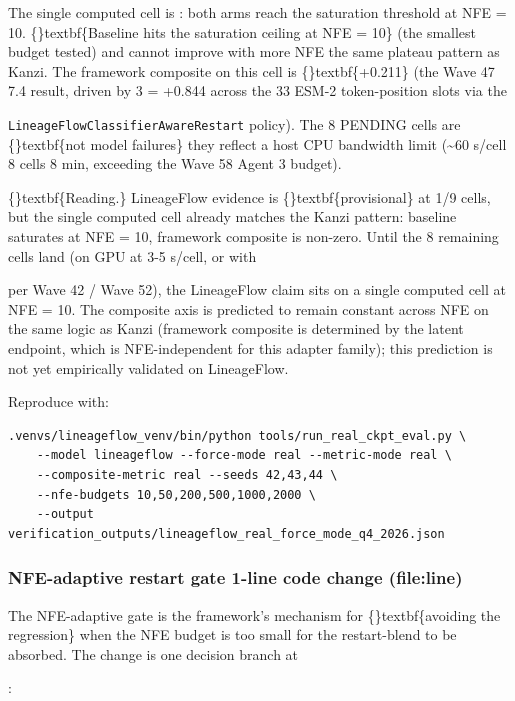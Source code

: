 \documentclass{article}
\begin{document}
The single computed cell is : both arms reach the  saturation threshold at NFE = 10. \{\}textbf\{Baseline hits the saturation ceiling at NFE = 10\} (the smallest budget tested) and cannot improve with more NFE  the same plateau pattern as Kanzi. The framework composite on this cell is \{\}textbf\{+0.211\} (the Wave 47 7.4 result, driven by 3 = +0.844 across the 33 ESM-2 token-position slots via the

\texttt{LineageFlowClassifierAwareRestart} policy). The 8 PENDING cells are \{\}textbf\{not model failures\}  they reflect a host CPU bandwidth limit (\textasciitilde{}60 s/cell  8 cells  8 min, exceeding the Wave 58 Agent 3 budget).

\{\}textbf\{Reading.\} LineageFlow evidence is \{\}textbf\{provisional\} at 1/9 cells, but the single computed cell already matches the Kanzi pattern: baseline saturates at NFE = 10, framework composite is non-zero. Until the 8 remaining cells land (on GPU at  3-5 s/cell, or with

 per Wave 42 / Wave 52), the LineageFlow claim sits on a single computed cell at NFE = 10. The composite axis is predicted to remain constant across NFE on the same logic as Kanzi (framework composite is determined by the latent endpoint, which is NFE-independent for this adapter family); this prediction is not yet empirically validated on LineageFlow.

Reproduce with:

\begin{verbatim}
.venvs/lineageflow_venv/bin/python tools/run_real_ckpt_eval.py \
    --model lineageflow --force-mode real --metric-mode real \
    --composite-metric real --seeds 42,43,44 \
    --nfe-budgets 10,50,200,500,1000,2000 \
    --output verification_outputs/lineageflow_real_force_mode_q4_2026.json
\end{verbatim}
\subsubsection{NFE-adaptive restart gate  1-line code change (file:line)}
The NFE-adaptive gate is the framework's mechanism for \{\}textbf\{avoiding the regression\} when the NFE budget is too small for the restart-blend to be absorbed. The change is one decision branch at

:
\end{document}
